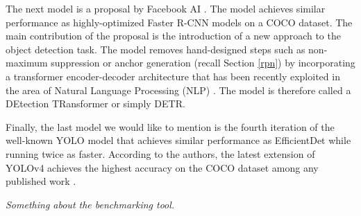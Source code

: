 The next model is a proposal by Facebook AI \cite{detr}. The model achieves similar
performance as highly-optimized Faster R-CNN models on a COCO dataset. The main
contribution of the proposal is the introduction of a new approach to the object
detection task. The model removes hand-designed steps such as non-maximum
suppression or anchor generation (recall Section \ref{rpn}) by incorporating a
transformer encoder-decoder architecture \cite{transformer} that has been
recently exploited in the area of Natural Language Processing (NLP)
\cite{bert, gpt3}. The model is therefore called a DEtection TRansformer or
simply DETR.

Finally, the last model we would like to mention is the fourth iteration of the
well-known YOLO model \cite{yolo1, yolo2, yolo3, yolo4} that achieves similar
performance as EfficientDet while running twice as faster. According to the
authors, the latest extension of YOLOv4 achieves the highest accuracy on the
COCO dataset among any published work \cite{yolo4scaled}.

\textit{Something about the benchmarking tool.}
